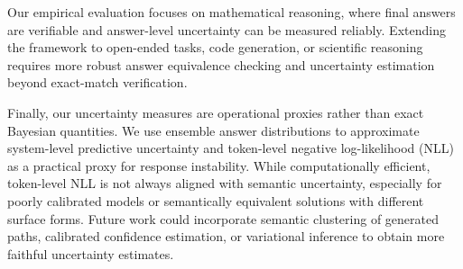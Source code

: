 \documentclass{article}
\theoremstyle{plain}
\theoremstyle{definition}
\theoremstyle{remark}
\begin{document}
Our empirical evaluation focuses on mathematical reasoning, where final answers are verifiable and answer-level uncertainty can be measured reliably. Extending the framework to open-ended tasks, code generation, or scientific reasoning requires more robust answer equivalence checking and uncertainty estimation beyond exact-match verification.

Finally, our uncertainty measures are operational proxies rather than exact Bayesian quantities. We use ensemble answer distributions to approximate system-level predictive uncertainty and token-level negative log-likelihood (NLL) as a practical proxy for response instability. While computationally efficient, token-level NLL is not always aligned with semantic uncertainty, especially for poorly calibrated models or semantically equivalent solutions with different surface forms. Future work could incorporate semantic clustering of generated paths, calibrated confidence estimation, or variational inference to obtain more faithful uncertainty estimates.



\end{document}
